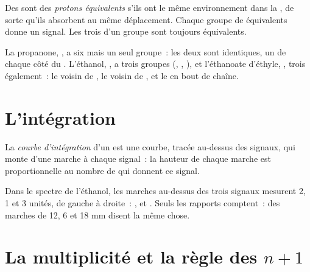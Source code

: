 \begin{definition}\label{def:g12:proton-nmr:equivalent}
Des  sont des \emph{protons équivalents}
s'ils ont le même environnement dans la , de sorte qu'ils
absorbent au même déplacement. Chaque groupe de  équivalents donne
un signal. Les trois  d'un groupe  sont toujours
équivalents.
\end{definition}

\begin{example}\label{ex:g12:proton-nmr:groups}
La propanone, , a six  mais un seul groupe~: les
deux  sont identiques, un de chaque côté du . L'éthanol,
, a trois groupes (, , ), et
l'éthanoate d'éthyle, , trois également~: le
 voisin de , le  voisin de , et le
 en bout de chaîne.
\end{example}

\section{L'intégration}

\begin{definition}\label{def:g12:proton-nmr:integration}
La \emph{courbe d'intégration} d'un  est une courbe, tracée au-dessus des signaux, qui monte d'une
marche à chaque signal~: la hauteur de chaque marche est proportionnelle
au nombre de  qui donnent ce signal.
\end{definition}

\begin{example}\label{ex:g12:proton-nmr:steps}
Dans le spectre de l'éthanol, les marches au-dessus des trois signaux
mesurent 2, 1 et 3 unités, de gauche à droite~: ,  et
. Seuls les rapports comptent~: des marches de 12, 6 et 18 mm
disent la même chose.
\end{example}

\section{La multiplicité et la règle des \texorpdfstring{$n+1$}{n+1}}


